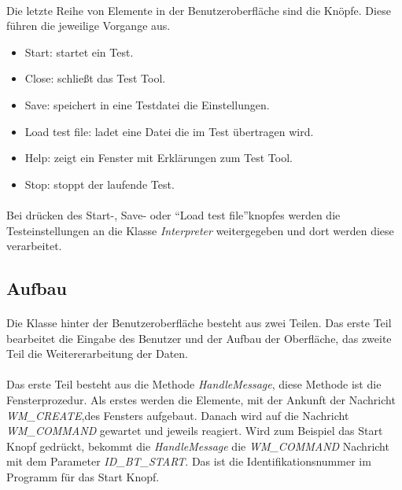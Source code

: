 \paragraph{}
Die letzte Reihe von Elemente in der Benutzeroberfläche sind die Knöpfe. Diese führen die jeweilige Vorgange aus.
\begin{itemize}
\item Start: startet ein Test.
\item Close: schließt das Test Tool.
\item Save: speichert in eine Testdatei die Einstellungen.
\item Load test file: ladet eine Datei die im Test übertragen wird.
\item Help: zeigt ein Fenster mit Erklärungen zum Test Tool.
\item Stop: stoppt der laufende Test.
\end{itemize}

\paragraph{}
Bei drücken des Start-, Save- oder "`Load test file"'knopfes werden die Testeinstellungen an die Klasse \textit{Interpreter} weitergegeben und dort werden diese verarbeitet.


\subsection{Aufbau}

\paragraph{}
Die Klasse hinter der Benutzeroberfläche besteht aus zwei Teilen. Das erste Teil bearbeitet die Eingabe des Benutzer und der Aufbau der Oberfläche, das zweite Teil die Weitererarbeitung der Daten.

\paragraph{}
Das erste Teil besteht aus die Methode \textit{HandleMessage}, diese Methode ist die Fensterprozedur. Als erstes werden die Elemente, mit der Ankunft der Nachricht \textit{WM\_CREATE},des Fensters aufgebaut. Danach wird auf die Nachricht \textit{WM\_COMMAND} gewartet und jeweils reagiert. Wird zum Beispiel das Start Knopf gedrückt, bekommt die \textit{HandleMessage} die \textit{WM\_COMMAND} Nachricht mit dem Parameter \textit{ID\_BT\_START}. Das ist die Identifikationsnummer im Programm für das Start Knopf.

